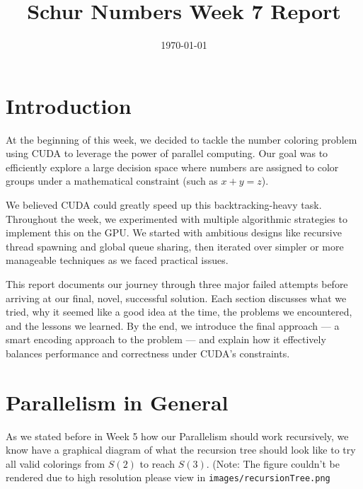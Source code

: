 \documentclass[12pt]{article}
\begin{document}
\title{Schur Numbers Week 7 Report}
\date{\today}

\tableofcontents
\newpage
\maketitle

\section*{Introduction}

At the beginning of this week, we decided to tackle the number coloring problem using CUDA to leverage the power of parallel computing. Our goal was to efficiently explore a large decision space where numbers are assigned to color groups under a mathematical constraint (such as \(x + y = z\)).

We believed CUDA could greatly speed up this backtracking-heavy task. Throughout the week, we experimented with multiple algorithmic strategies to implement this on the GPU. We started with ambitious designs like recursive thread spawning and global queue sharing, then iterated over simpler or more manageable techniques as we faced practical issues.

This report documents our journey through three major failed attempts before arriving at our final, novel, successful solution. Each section discusses what we tried, why it seemed like a good idea at the time, the problems we encountered, and the lessons we learned. By the end, we introduce the final approach — a smart encoding approach to the problem — and explain how it effectively balances performance and correctness under CUDA's constraints.


\section{Parallelism in General}

As we stated before in Week 5 how our Parallelism should work recursively, we know have a graphical diagram of what the recursion tree should look like to try all valid colorings from $S(2)$ to reach $S(3)$. (Note: The figure couldn't be rendered due to high resolution please view in \texttt{images/recursionTree.png}
\end{document}

